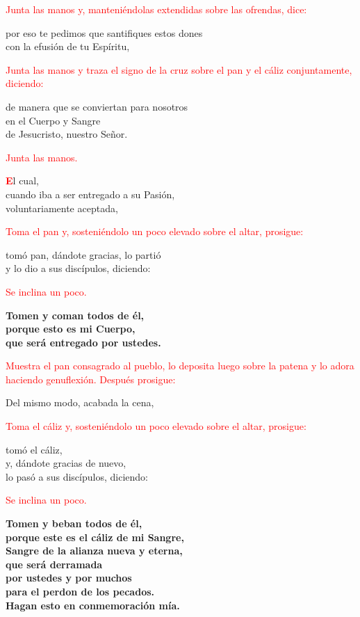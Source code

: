 \documentclass[12pt, letterpaper]{report}
\begin{document}
\large{\textcolor{red}{Junta las manos y, manteni\'endolas extendidas sobre las ofrendas, dice:}}

\noindent
\Large por eso te pedimos que santifiques estos dones\\
con la efusi\'on de tu Esp\'iritu,

\large{\textcolor{red}{Junta las manos y traza el signo de la cruz sobre el pan y el c\'aliz conjuntamente, diciendo:}}

\noindent
\Large de manera que se conviertan para nosotros\\
en el Cuerpo y \Huge{\textcolor{red}{}} \Large Sangre\\
de Jesucristo, nuestro Se\~nor.

\large{\textcolor{red}{Junta las manos.}}

\lettrine[lines=1]{\bfseries \textcolor{red}{E}}{}\Large l cual,\\
cuando iba a ser entregado a su Pasi\'on,\\
voluntariamente aceptada,

\large{\textcolor{red}{Toma el pan y, sosteni\'endolo un poco elevado sobre el altar, prosigue:}}

\noindent
\Large tom\'o pan, d\'andote gracias, lo parti\'o\\
y lo dio a sus disc\'ipulos, diciendo:

\large{\textcolor{red}{Se inclina un poco.}} 

\noindent
\LARGE{\bfseries{Tomen y coman todos de \'el,\\
porque esto es mi Cuerpo,\\
que ser\'a entregado por ustedes.}}

\large{\textcolor{red}{Muestra el pan consagrado al pueblo, lo deposita luego sobre la patena y lo adora haciendo genuflexi\'on. Despu\'es prosigue:}}

\noindent
\Large Del mismo modo, acabada la cena,

\large{\textcolor{red}{Toma el c\'aliz y, sosteni\'endolo un poco elevado sobre el altar, prosigue:}}

\noindent
\Large tom\'o el c\'aliz,\\
y, d\'andote gracias de nuevo,\\
lo pas\'o a sus disc\'ipulos, diciendo:

\large{\textcolor{red}{Se inclina un poco.}}

\noindent
\LARGE{\bfseries{Tomen y beban todos de \'el,\\
porque este es el c\'aliz de mi Sangre,\\
Sangre de la alianza nueva y eterna,\\
que ser\'a derramada\\
por ustedes y por muchos\\
para el perdon de los pecados.\\
Hagan esto en conmemoraci\'on m\'ia.}}
\end{document}
